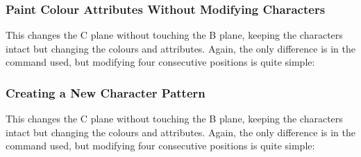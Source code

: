 \subsubsection{Paint Colour Attributes Without Modifying Characters}

This changes the C plane without touching the B plane, keeping the characters
intact but changing the colours and attributes. Again, the only difference is
in the command used, but modifying four consecutive positions is quite simple:




\subsubsection{Creating a New Character Pattern}

This changes the C plane without touching the B plane, keeping the characters
intact but changing the colours and attributes. Again, the only difference is
in the command used, but modifying four consecutive positions is quite simple:

